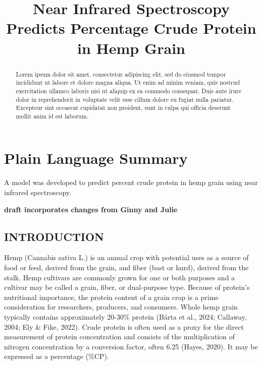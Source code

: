 \documentclass[
]{agujournal2019}
\begin{document}
\title{Near Infrared Spectroscopy Predicts Percentage Crude Protein in
Hemp Grain}



\begin{abstract}
Lorem ipsum dolor sit amet, consectetur adipiscing elit, sed do eiusmod
tempor incididunt ut labore et dolore magna aliqua. Ut enim ad minim
veniam, quis nostrud exercitation ullamco laboris nisi ut aliquip ex ea
commodo consequat. Duis aute irure dolor in reprehenderit in voluptate
velit esse cillum dolore eu fugiat nulla pariatur. Excepteur sint
occaecat cupidatat non proident, sunt in culpa qui officia deserunt
mollit anim id est laborum.
\end{abstract}

\section*{Plain Language Summary}
A model was developed to predict percent crude protein in hemp grain
using near infrared spectroscopy.



\textbf{draft incorporates changes from Ginny and Julie}

\subsection{INTRODUCTION}\label{introduction}

Hemp (Cannabis sativa L.) is an annual crop with potential uses as a
source of food or feed, derived from the grain, and fiber (bast or
hurd), derived from the stalk. Hemp cultivars are commonly grown for one
or both purposes and a cultivar may be called a grain, fiber, or
dual-purpose type. Because of protein's nutritional importance, the
protein content of a grain crop is a prime consideration for
researchers, producers, and consumers. Whole hemp grain typically
contains approximately 20-30\% protein (Bárta et al., 2024; Callaway,
2004; Ely \& Fike, 2022). Crude protein is often used as a proxy for the
direct measurement of protein concentration and consists of the
multiplication of nitrogen concentration by a conversion factor, often
6.25 (Hayes, 2020). It may be expressed as a percentage (\%CP).
\end{document}
